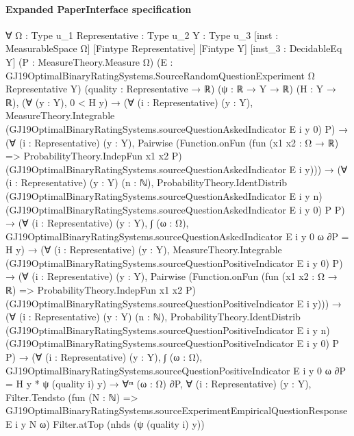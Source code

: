 \documentclass[10pt]{article}
\begin{document}
\paragraph{Expanded PaperInterface specification}
\begin{ReviewVerbatim}
∀ {Ω : Type u_1} {Representative : Type u_2} {Y : Type u_3} [inst : MeasurableSpace Ω] [Fintype Representative]
  [Fintype Y] [inst_3 : DecidableEq Y] (P : MeasureTheory.Measure Ω)
  (E : GJ19OptimalBinaryRatingSystems.SourceRandomQuestionExperiment Ω Representative Y) (quality : Representative → ℝ)
  (ψ : ℝ → Y → ℝ) (H : Y → ℝ),
  (∀ (y : Y), 0 < H y) →
    (∀ (i : Representative) (y : Y),
        MeasureTheory.Integrable (GJ19OptimalBinaryRatingSystems.sourceQuestionAskedIndicator E i y 0) P) →
      (∀ (i : Representative) (y : Y),
          Pairwise
            (Function.onFun (fun (x1 x2 : Ω → ℝ) => ProbabilityTheory.IndepFun x1 x2 P)
              (GJ19OptimalBinaryRatingSystems.sourceQuestionAskedIndicator E i y))) →
        (∀ (i : Representative) (y : Y) (n : ℕ),
            ProbabilityTheory.IdentDistrib (GJ19OptimalBinaryRatingSystems.sourceQuestionAskedIndicator E i y n)
              (GJ19OptimalBinaryRatingSystems.sourceQuestionAskedIndicator E i y 0) P P) →
          (∀ (i : Representative) (y : Y),
              ∫ (ω : Ω), GJ19OptimalBinaryRatingSystems.sourceQuestionAskedIndicator E i y 0 ω ∂P = H y) →
            (∀ (i : Representative) (y : Y),
                MeasureTheory.Integrable (GJ19OptimalBinaryRatingSystems.sourceQuestionPositiveIndicator E i y 0) P) →
              (∀ (i : Representative) (y : Y),
                  Pairwise
                    (Function.onFun (fun (x1 x2 : Ω → ℝ) => ProbabilityTheory.IndepFun x1 x2 P)
                      (GJ19OptimalBinaryRatingSystems.sourceQuestionPositiveIndicator E i y))) →
                (∀ (i : Representative) (y : Y) (n : ℕ),
                    ProbabilityTheory.IdentDistrib
                      (GJ19OptimalBinaryRatingSystems.sourceQuestionPositiveIndicator E i y n)
                      (GJ19OptimalBinaryRatingSystems.sourceQuestionPositiveIndicator E i y 0) P P) →
                  (∀ (i : Representative) (y : Y),
                      ∫ (ω : Ω), GJ19OptimalBinaryRatingSystems.sourceQuestionPositiveIndicator E i y 0 ω ∂P =
                        H y * ψ (quality i) y) →
                    ∀ᵐ (ω : Ω) ∂P,
                      ∀ (i : Representative) (y : Y),
                        Filter.Tendsto
                          (fun (N : ℕ) =>
                            GJ19OptimalBinaryRatingSystems.sourceExperimentEmpiricalQuestionResponse E i y N ω)
                          Filter.atTop (nhds (ψ (quality i) y))
\end{ReviewVerbatim}
\end{document}
